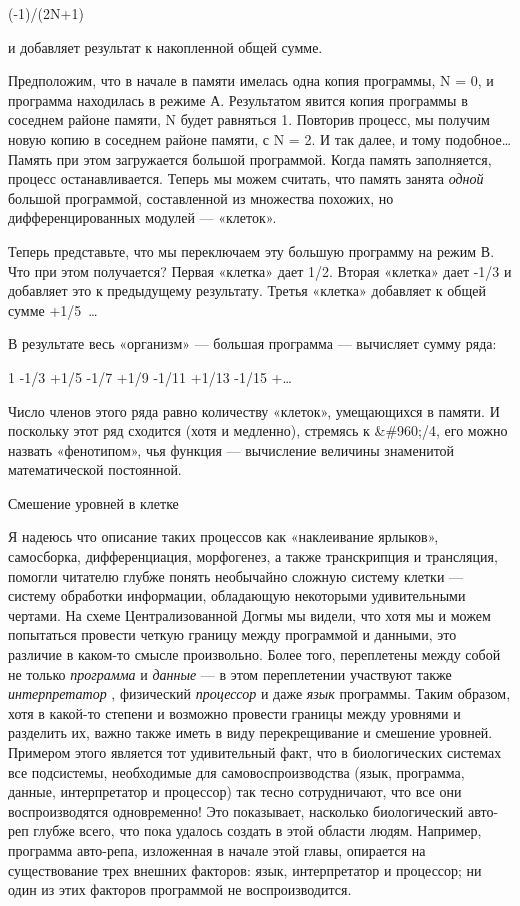 (-1)/(2N+1)

и добавляет результат к накопленной общей сумме.

Предположим, что в начале в памяти имелась одна копия программы, N = 0, и программа находилась в режиме А. Результатом явится копия программы в соседнем районе памяти, N будет равняться 1. Повторив процесс, мы получим новую копию в соседнем районе памяти, с N = 2. И так далее, и тому подобное\ldots{} Память при этом загружается большой программой. Когда память заполняется, процесс останавливается. Теперь мы можем считать, что память занята \emph{одной} большой программой, составленной из множества похожих, но дифференцированных модулей --- «клеток».

Теперь представьте, что мы переключаем эту большую программу на режим В. Что при этом получается? Первая «клетка» дает 1/2. Вторая «клетка» дает -1/3 и добавляет это к предыдущему результату. Третья «клетка» добавляет к общей сумме +1/5~\ldots{}

В результате весь «организм» --- большая программа --- вычисляет сумму ряда:

1 -1/3 +1/5 -1/7 +1/9 -1/11 +1/13 -1/15 +\ldots{}

Число членов этого ряда равно количеству «клеток», умещающихся в памяти. И поскольку этот ряд сходится (хотя и медленно), стремясь к \&\#960;/4, его можно назвать «фенотипом», чья функция --- вычисление величины знаменитой математической постоянной.

Смешение уровней в клетке

Я надеюсь что описание таких процессов как «наклеивание ярлыков», самосборка, дифференциация, морфогенез, а также транскрипция и трансляция, помогли читателю глубже понять необычайно сложную систему клетки --- систему обработки информации, обладающую некоторыми удивительными чертами. На схеме Централизованной Догмы мы видели, что хотя мы и можем попытаться провести четкую границу между программой и данными, это различие в каком-то смысле произвольно. Более того, переплетены между собой не только \emph{программа} и \emph{данные} --- в этом переплетении участвуют также \emph{интерпретатор} , физический \emph{процессор} и даже \emph{язык} программы. Таким образом, хотя в какой-то степени и возможно провести границы между уровнями и разделить их, важно также иметь в виду перекрещивание и смешение уровней. Примером этого является тот удивительный факт, что в биологических системах все подсистемы, необходимые для самовоспроизводства (язык, программа, данные, интерпретатор и процессор) так тесно сотрудничают, что все они воспроизводятся одновременно! Это показывает, насколько биологический авто-реп глубже всего, что пока удалось создать в этой области людям. Например, программа авто-репа, изложенная в начале этой главы, опирается на существование трех внешних факторов: язык, интерпретатор и процессор; ни один из этих факторов программой не воспроизводится.

